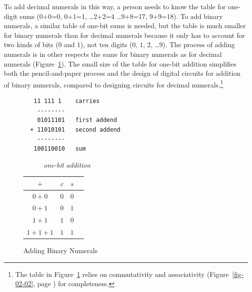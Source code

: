 To add decimal numerals in this way, a person needs to know
the table for one-digit sums (0+0=0, 0+1=1, \dots 2+2=4 \dots 9+8=17, 9+9=18).
To add binary numerals, a similar table of one-bit sums is needed,
but the table is much smaller for binary numerals
than for decimal numerals because it only has to account for 
two kinds of bits ($0$ and $1$), not ten digits ($0$, $1$, $2$, \dots $9$).
The process of adding numerals is in other respects
the same for binary numerals as for decimal numerals 
(Figure~\ref{fig:adding-binary-numerals}).
The small size of the table for one-bit addition simplifies 
both the pencil-and-paper process and the design of
digital circuits for addition of binary numerals, compared to
designing circuits for decimal numerals.\footnote{The table
in Figure~\ref{fig:adding-binary-numerals} 
relies on commutativity and associativity
(Figure~\ref{fig-02-02}, page \pageref{fig-02-02})
for completeness.}

\begin{figure}[!tbp]
\begin{center}
\begin{minipage}[b]{0.4\textwidth}
\begin{verbatim}
   11 111 1    carries
    --------
    01011101   first addend
  + 11010101   second addend
    --------
   100110010   sum
\end{verbatim}
\end{minipage}
\hfill
\begin{minipage}[b]{0.4\textwidth}
~~~~~~\emph{one-bit addition}\\
\vspace{.05 in}
\begin{tabular}{|c|c|c|c}
 \hline
 $+$      & $c$ & $s$ \\
 \hline
 $0+0$    & $0$ & $0$ \\
 \hline
 $0+1$    & $0$ & $1$ \\
 \hline
 $1+1$    & $1$ & $0$ \\
 \hline
 $1+1+1$  & $1$ & $1$ \\
 \hline
\end{tabular}
\end{minipage}
\end{center}
\caption{Adding Binary Numerals}
\label{fig:adding-binary-numerals}
\end{figure}

